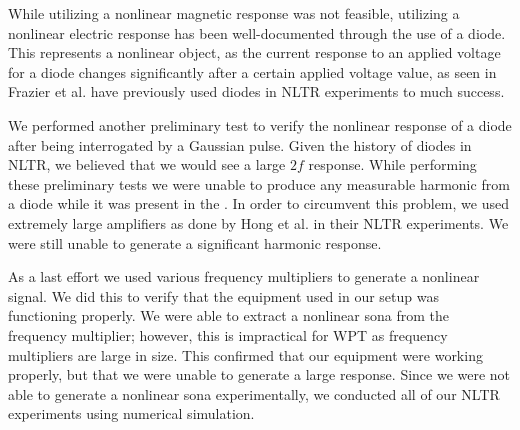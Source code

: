 While utilizing a nonlinear magnetic response was not feasible, utilizing a nonlinear electric response has been well-documented through the use of a diode. This represents a nonlinear object, as the current response to an applied voltage for a diode changes significantly after a certain applied voltage value, as seen in Frazier et al. have previously used diodes in NLTR experiments to much success.

We performed another preliminary test to verify the nonlinear response of a diode after being interrogated by a Gaussian pulse. Given the history of diodes in NLTR, we believed that we would see a large $2f$ response. While performing these preliminary tests we were unable to produce any measurable harmonic from a diode while it was present in the \giga{}. In order to circumvent this problem, we used extremely large amplifiers as done by Hong et al. in their NLTR experiments. We were still unable to generate a significant harmonic response.

As a last effort we used various frequency multipliers to generate a nonlinear signal. We did this to verify that the equipment used in our setup was functioning properly. We were able to extract a nonlinear sona from the frequency multiplier; however, this is impractical for WPT as frequency multipliers are large in size. This confirmed that our equipment were working properly, but that we were unable to generate a large response. Since we were not able to generate a nonlinear sona experimentally, we conducted all of our NLTR experiments using numerical simulation.
